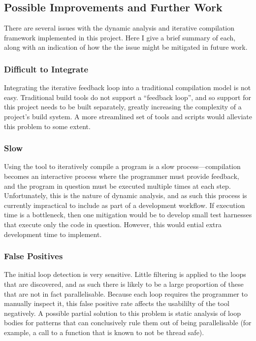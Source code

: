 \documentclass[journal]{IEEEtran}
\begin{document}
\subsection{Possible Improvements and Further Work}

There are several issues with the dynamic analysis and iterative compilation
framework implemented in this project. Here I give a brief summary of each,
along with an indication of how the the issue might be mitigated in future work.

\subsubsection{Difficult to Integrate}

Integrating the iterative feedback loop into a traditional compilation model is
not easy. Traditional build tools do not support a ``feedback loop'', and so
support for this project needs to be built separately, greatly increasing the
complexity of a project's build system. A more streamlined set of tools and
scripts would alleviate this problem to some extent.

\subsubsection{Slow} 

Using the tool to iteratively compile a program is a slow process---compilation
becomes an interactive process where the programmer must provide feedback, and
the program in question must be executed multiple times at each step.
Unfortunately, this is the nature of dynamic analysis, and as such this process
is currently impractical to include as part of a development workflow. If
execution time is a bottleneck, then one mitigation would be to develop small
test harnesses that execute only the code in question. However, this would
ential extra development time to implement.

\subsubsection{False Positives}

The initial loop detection is very sensitive. Little filtering is applied to the
loops that are discovered, and as such there is likely to be a large proportion
of these that are not in fact parallelisable. Because each loop requires the
programmer to manually inspect it, this false positive rate affects the
usabililty of the tool negatively. A possible partial solution to this problem
is static analysis of loop bodies for patterns that can conclusively rule them
out of being parallelisable (for example, a call to a function that is known to
not be thread safe).
\end{document}
